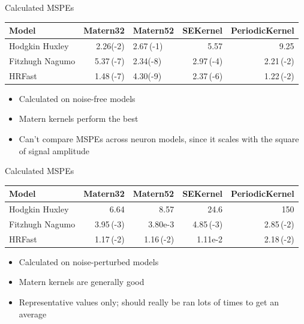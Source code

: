 \documentclass[presentation]{beamer}
\begin{document}
\begin{frame}[label={sec:org02a4e79}]{Calculated MSPEs}
\begin{center}
\begin{tabular}{lrlrr}
\hline
Model & Matern32 & Matern52 & SEKernel & PeriodicKernel\\
\hline
Hodgkin Huxley & \alert{2.26(-2)} & 2.67\,(-1) & 5.57 & 9.25\\
Fitzhugh Nagumo & 5.37\,(-7) & \alert{2.34(-8)} & 2.97\,(-4) & 2.21\,(-2)\\
HRFast & 1.48\,(-7) & \alert{4.30(-9)} & 2.37\,(-6) & 1.22\,(-2)\\
\hline
\end{tabular}
\end{center}

\begin{itemize}
\item Calculated on noise-free models
\item Matern kernels perform the best
\item Can't compare MSPEs across neuron models, since it scales with the square of signal amplitude
\end{itemize}
\end{frame}

\begin{frame}[label={sec:orga15dd39}]{Calculated MSPEs}
\begin{center}
\begin{tabular}{lrrrr}
\hline
Model & Matern32 & Matern52 & SEKernel & PeriodicKernel\\
\hline
Hodgkin Huxley & \alert{6.64} & 8.57 & 24.6 & 150\\
Fitzhugh Nagumo & 3.95\,(-3) & \alert{3.80e-3} & 4.85\,(-3) & 2.85\,(-2)\\
HRFast & 1.17\,(-2) & 1.16\,(-2) & \alert{1.11e-2} & 2.18\,(-2)\\
\hline
\end{tabular}
\end{center}

\begin{itemize}
\item Calculated on noise-perturbed models
\item Matern kernels are generally good
\item Representative values only; should really be ran lots of times to get an average
\end{itemize}
\end{frame}
\end{document}
